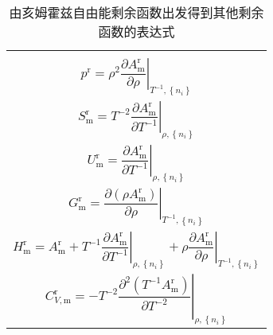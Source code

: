 \documentclass[main.tex]{subfiles}
\begin{document}
\setlength{}
\begin{longtable}{m{}}
    \caption{由亥姆霍兹自由能剩余函数出发得到其他剩余函数的表达式}\label{table:residual_functions_from_Ar}
    \\\hline \\
    \begin{equation}
        p^\text{r}=\rho^2\left.\frac{\partial A^\text{r}_\text{m}}{\partial \rho}\right|_{T^{-1},\left\{n_i\right\}}
    \end{equation}                                                                                                                                                                                  \\ [-5ex]
    \begin{equation}
        S^\text{r}_\text{m}=T^{-2}\left.\frac{\partial A^\text{r}_\text{m}}{\partial T^{-1}}\right|_{\rho,\left\{n_i\right\}}
    \end{equation}                                                                                                                                                  \\ [-5ex]
    \begin{equation}
        U^\text{r}_\text{m}=\left.\frac{\partial A^\text{r}_\text{m}}{\partial T^{-1}}\right|_{\rho,\left\{n_i\right\}}
    \end{equation}                                                                                                                                                        \\ [-5 ex]
    \begin{equation}
        G^\text{r}_\text{m}=\left.\frac{\partial\left(\rho A^\text{r}_\text{m}\right)}{\partial\rho}\right|_{T^{-1},\left\{n_i\right\}}
    \end{equation}                                                                                                                                                                                                           \\ [-5ex]
    \begin{equation}
        H^\text{r}_\text{m}=A^\text{r}_\text{m}+T^{-1}\left.\frac{\partial A^\text{r}_\text{m}}{\partial T^{-1}}\right|_{\rho,\left\{n_i\right\}}+\rho\left.\frac{\partial A^\text{r}_\text{m}}{\partial\rho}\right|_{T^{-1},\left\{n_i\right\}}
    \end{equation} \\ [-5ex]
    \begin{equation}
        C^\text{r}_{V,\text{m}}=-T^{-2}\left.\frac{\partial^2\left(T^{-1}A^\text{r}_\text{m}\right)}{\partial T^{-2}}\right|_{\rho,\left\{n_i\right\}}
    \end{equation}                                                                                                                                                                      \\
    \hline
\end{longtable}
\end{document}
